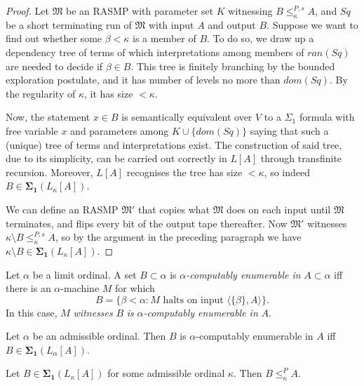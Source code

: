 \documentclass[12pt]{article}
\numberwithin{equation}{section}
\begin{document}
\begin{proof}
Let $\mathfrak{M}$ be an RASMP with parameter set $K$ witnessing $B \leq^{P, s}_{\kappa} A$, and $Sq$ be a short terminating run of $\mathfrak{M}$ with input $A$ and output $B$. Suppose we want to find out whether some $\beta < \kappa$ is a member of $B$. To do so, we draw up a dependency tree of terms of which interpretations among members of $ran(Sq)$ are needed to decide if $\beta \in B$. This tree is finitely branching by the bounded exploration postulate, and it has number of levels no more than $dom(Sq)$. By the regularity of $\kappa$, it has size $< \kappa$. 

Now, the statement $x \in B$ is semantically equivalent over $V$ to a $\Sigma_1$ formula with free variable $x$ and parameters among $K \cup \{dom(Sq)\}$ saying that such a (unique) tree of terms and interpretations exist. The construction of said tree, due to its simplicity, can be carried out correctly in $L[A]$ through transfinite recursion. Moreover, $L[A]$ recognises the tree has size $< \kappa$, so indeed $B \in \mathbf{\Sigma_1}(L_{\kappa}[A])$.

We can define an RASMP $\mathfrak{M}'$ that copies what $\mathfrak{M}$ does on each input until $\mathfrak{M}$ terminates, and flips every bit of the output tape thereafter. Now $\mathfrak{M}'$ witnesses $\kappa \setminus B \leq^{P, s}_{\kappa} A$, so by the argument in the preceding paragraph we have $\kappa \setminus B \in \mathbf{\Sigma_1}(L_{\kappa}[A])$.
\end{proof}

\begin{defi}
Let $\alpha$ be a limit ordinal. A set $B \subset \alpha$ is $\alpha$\emph{-computably enumerable in} $A \subset \alpha$ iff there is an $\alpha$-machine $M$ for which
\begin{equation*}
    B = \{\beta < \alpha : M \text{ halts on input } \langle \{\beta\}, A \rangle\} \text{.}
\end{equation*}
In this case, $M$ \emph{witnesses} $B$ \emph{is} $\alpha$\emph{-computably enumerable in} $A$.
\end{defi}

\begin{fact}\label{fact272}
Let $\alpha$ be an admissible ordinal. Then $B$ is $\alpha$-computably enumerable in $A$ iff $B \in \mathbf{\Sigma_1}(L_{\alpha}[A])$.
\end{fact}

\begin{lem}\label{lem273}
Let $B \in \mathbf{\Sigma_1}(L_{\kappa}[A])$ for some admissible ordinal $\kappa$. Then $B \leq^P_{\kappa} A$.
\end{lem}
\end{document}
